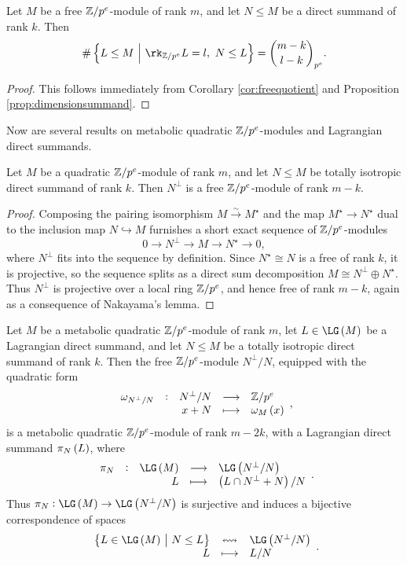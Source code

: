 \begin{corollary}
\label{cor:dimensioncontainment}
Let $ M $ be a free $ \mathbb{Z} / p^e $-module of rank $ m $, and let $ N \le M $ be a direct summand of rank $ k $. Then
$$ \#\cbr{L \le M \st \rk_{\ZZ / p^e} L = l, \ N \le L} = \binom{m - k}{l - k}_{p^e}. $$
\end{corollary}

\begin{proof}
This follows immediately from Corollary \ref{cor:freequotient} and Proposition \ref{prop:dimensionsummand}.
\end{proof}

Now are several results on metabolic quadratic $ \mathbb{Z} / p^e $-modules and Lagrangian direct summands.

\begin{lemma}
\label{lem:summandrank}
Let $ M $ be a quadratic $ \mathbb{Z} / p^e $-module of rank $ m $, and let $ N \le M $ be totally isotropic direct summand of rank $ k $. Then $ N^\perp $ is a free $ \mathbb{Z} / p^e $-module of rank $ m - k $.
\end{lemma}

\begin{proof}
Composing the pairing isomorphism $ M \xrightarrow{\sim} M^\star $ and the map $ M^\star \to N^\star $ dual to the inclusion map $ N \hookrightarrow{M} $ furnishes a short exact sequence of $ \mathbb{Z} / p^e $-modules
$$ 0 \to N^\perp \to M \to N^\star \to 0, $$
where $ N^\perp $ fits into the sequence by definition. Since $ N^\star \cong N $ is a free of rank $ k $, it is projective, so the sequence splits as a direct sum decomposition $ M \cong N^\perp \oplus N^\star $. Thus $ N^\perp $ is projective over a local ring $ \mathbb{Z} / p^e $, and hence free of rank $ m - k $, again as a consequence of Nakayama's lemma.
\end{proof}

\begin{proposition}
\label{prop:quotientcorrespondence}
Let $ M $ be a metabolic quadratic $ \mathbb{Z} / p^e $-module of rank $ m $, let $ L \in \LG\br{M} $ be a Lagrangian direct summand, and let $ N \le M $ be a totally isotropic direct summand of rank $ k $. Then the free $ \mathbb{Z} / p^e $-module $ N^\perp / N $, equipped with the quadratic form
$$ \function[\omega_{N^\perp / N}]{N^\perp / N}{\ZZ / p^e}{x + N}{\omega_M\br{x}}, $$
is a metabolic quadratic $ \mathbb{Z} / p^e $-module of rank $ m - 2k $, with a Lagrangian direct summand $ \pi_N\br{L} $, where
$$ \function[\pi_N]{\LG\br{M}}{\LG\br{N^\perp / N}}{L}{\br{L \cap N^\perp + N} / N}. $$
Thus $ \pi_N : \LG\br{M} \to \LG\br{N^\perp / N} $ is surjective and induces a bijective correspondence of spaces
$$ \bijection{\cbr{L \in \LG\br{M} \st N \le L}}{\LG\br{N^\perp / N}}{L}{L / N}. $$
\end{proposition}

